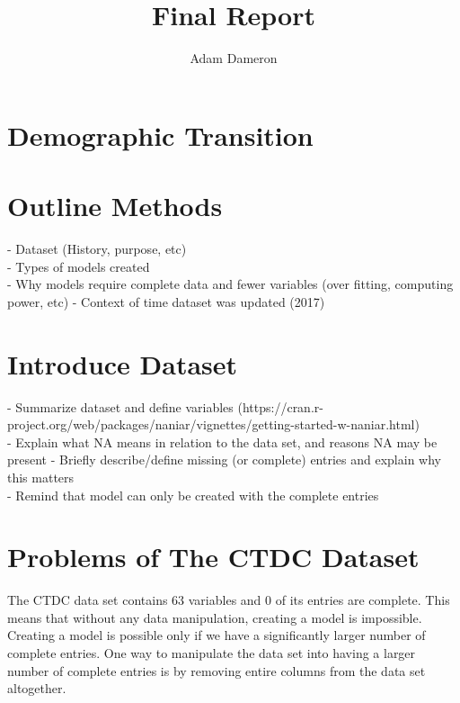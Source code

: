\documentclass{article} %
\title{Final Report}
\author{
	Adam Dameron
}
\begin{document}
	
	
	\maketitle
	
	\begin{abstract}
		
	\end{abstract}
	
	\section{Demographic Transition}
	
	\section{Outline Methods}
	
	- Dataset (History, purpose, etc)\\
	- Types of models created\\
		- Why models require complete data and fewer variables (over fitting, computing power, etc)
		- Context of time dataset was updated (2017)
	
	
	\section{Introduce Dataset}
	
	- Summarize dataset and define variables (https://cran.r-project.org/web/packages/naniar/vignettes/getting-started-w-naniar.html)\\
	- Explain what NA means in relation to the data set, and reasons NA may be present
	- Briefly describe/define missing (or complete) entries and explain why this matters\\
	- Remind that model can only be created with the complete entries\\
	
	\newpage
	\section{Problems of The CTDC Dataset}
	

	
	The CTDC data set contains 63 variables and 0 of its entries are complete. This means that without any data manipulation, creating a model is impossible. Creating a model is possible only if we have a significantly larger number of complete entries. One way to manipulate the data set into having a larger number of complete entries is by removing entire columns from the data set altogether. 
	
\end{document}

